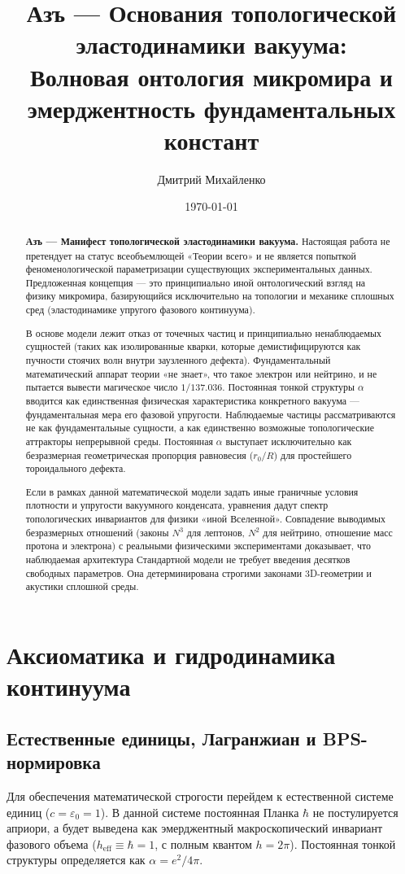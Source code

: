 \documentclass[11pt,a4paper]{article}
\title{\textbf{Азъ — Основания топологической\\ эластодинамики вакуума:\\ Волновая онтология микромира и эмерджентность фундаментальных констант}}
\author{Дмитрий Михайленко}
\date{\today}
\begin{document}
	
	\maketitle
	
	\begin{abstract}
		\textbf{Азъ — Манифест топологической эластодинамики вакуума.} 
		Настоящая работа не претендует на статус всеобъемлющей «Теории всего» и не является попыткой феноменологической параметризации существующих экспериментальных данных. Предложенная концепция — это принципиально иной онтологический взгляд на физику микромира, базирующийся исключительно на топологии и механике сплошных сред (эластодинамике упругого фазового континуума).
		
		В основе модели лежит отказ от точечных частиц и принципиально ненаблюдаемых сущностей (таких как изолированные кварки, которые демистифицируются как пучности стоячих волн внутри заузленного дефекта). Фундаментальный математический аппарат теории «не знает», что такое электрон или нейтрино, и не пытается вывести магическое число $1/137.036$. Постоянная тонкой структуры $\alpha$ вводится как единственная физическая характеристика конкретного вакуума — фундаментальная мера его фазовой упругости. Наблюдаемые частицы рассматриваются не как фундаментальные сущности, а как единственно возможные топологические аттракторы непрерывной среды. Постоянная $\alpha$ выступает исключительно как безразмерная геометрическая пропорция равновесия ($r_0/R$) для простейшего тороидального дефекта. 
		
		Если в рамках данной математической модели задать иные граничные условия плотности и упругости вакуумного конденсата, уравнения дадут спектр топологических инвариантов для физики «иной Вселенной». Совпадение выводимых безразмерных отношений (законы $N^3$ для лептонов, $N^2$ для нейтрино, отношение масс протона и электрона) с реальными физическими экспериментами доказывает, что наблюдаемая архитектура Стандартной модели не требует введения десятков свободных параметров. Она детерминирована строгими законами 3D-геометрии и акустики сплошной среды.
	\end{abstract}
	
	\section{Аксиоматика и гидродинамика континуума}
	
	\subsection{Естественные единицы, Лагранжиан и BPS-нормировка}
	Для обеспечения математической строгости перейдем к естественной системе единиц ($c = \varepsilon_0 = 1$). В данной системе постоянная Планка $\hbar$ не постулируется априори, а будет выведена как эмерджентный макроскопический инвариант фазового объема ($h_{\text{eff}} \equiv \hbar = 1$, с полным квантом $h = 2\pi$). Постоянная тонкой структуры определяется как $\alpha = e^2 / 4\pi$.
	
\end{document}

